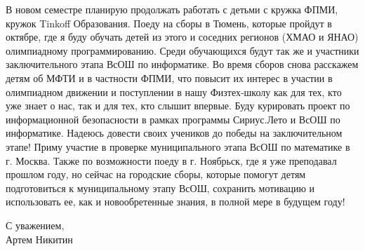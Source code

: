 \quad В новом семестре планирую продолжать работать с детьми с кружка ФПМИ, кружок Tinkoff Образования. Поеду на сборы в Тюмень, которые пройдут в
октябре, где я буду обучать детей из этого и соседних регионов (ХМАО и ЯНАО) олимпиадному программированию. Среди
обучающихся будут так же и участники заключительного этапа ВсОШ по информатике. Во время сборов снова расскажем детям об МФТИ и в
частности ФПМИ, что повысит их интерес в участии в олимпиадном движении и
поступлении в нашу Физтех-школу как для тех, кто уже знает о нас, так и для тех, кто слышит впервые. Буду курировать проект по информационной
безопасности в рамках программы Сириус.Лето и ВсОШ по информатике. Надеюсь довести своих учеников до победы на заключительном этапе!
Приму участие в проверке муниципального этапа ВсОШ по математике в г. Москва. Также по возможности поеду в г. Ноябрьск,
где я уже преподавал прошлом году, но сейчас на городские сборы, которые помогут детям подготовиться к муниципальному этапу ВсОШ, сохранить
мотивацию и использовать ее, как и новообретенные знания, в полной мере в будущем году!

\begin{flushright}
    С уважением, \\
    Артем Никитин
\end{flushright}

